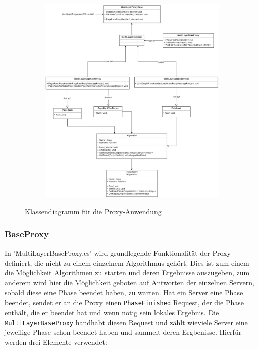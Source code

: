 \begin{figure}
  \centering
  \begin{subfigure}[b]{1.0\textwidth}
    \includegraphics[width=1.0\linewidth]{img/Klassendiagramm-Proxy.png}
  \end{subfigure}
  \caption{Klassendiagramm für die Proxy-Anwendung}
  \label{proxyClass}
\end{figure}


\subsubsection{BaseProxy}

In 'MultiLayerBaseProxy.cs' wird grundlegende Funktionalität der Proxy definiert, die nicht zu einem einzelnem Algorithmus gehört. Dies ist zum einem die Möglichkeit Algorithmen zu starten und deren Ergebnisse auszugeben, zum anderem wird hier die Möglichkeit geboten auf Antworten der einzelnen Servern, sobald diese eine Phase beendet haben, zu warten.
Hat ein Server eine Phase beendet, sendet er an die Proxy einen \verb|PhaseFinished| Request, der die Phase enthält, die er beendet hat und wenn nötig sein lokales Ergebnis. Die \verb|MultiLayerBaseProxy| handhabt diesen Request und zählt wieviele Server eine jeweilige Phase schon beendet haben und sammelt deren Ergbenisse. Hierfür werden drei Elemente verwendet:

